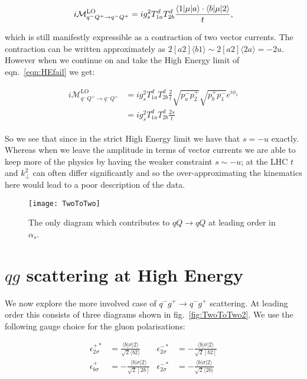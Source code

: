	\begin{equation}
		i\mathcal{M}_{q^-Q^+\rightarrow q^-Q^+}^{\text{LO}} = ig_s^2T^d_{1a}T^d_{2b}
		\frac{\langle 1 | \mu | a \rangle\cdot\langle b | \mu | 2 \rangle}{t},
		\label{eqn:HEfail}
	\end{equation}

	which is still manifestly expressible as a contraction of two vector currents.  The contraction
	can be written approximately as $2[a2]\langle b1\rangle\sim2[a2]\langle2a\rangle=-2u$.
	However when we continue on and take the High Energy limit of eqn.~\eqref{eqn:HEfail} we get:

	\begin{align}
	\begin{split}
		i\mathcal{M}_{q^-Q^+\rightarrow q^-Q^+}^{\text{LO}} &=
		ig_s^2T^d_{1a}T^d_{2b}\frac{2}{t}\sqrt{p_a^-p_2^+}\sqrt{p_b^+p_1^-}e^{i\phi_1}\\
		&=ig_s^2T^d_{1a}T^d_{2b}\frac{2s}{t}
		\label{eqn:HEfail2}
	\end{split}
	\end{align}

	So we see that since in the strict High Energy limit we have that $s=-u$
	exactly.  Whereas when we leave the amplitude in terms of vector currents we are able to keep
	more of the physics by having the weaker constraint $s\sim-u$; at the LHC $t$ and $k_\perp^2$
	can often differ significantly and so the over-approximating the kinematics here would
	lead to a poor description of the data.

	\begin{figure}
		\begin{center}
		\texttt{[image: TwoToTwo]}
		\caption{The only diagram which contributes to $qQ\rightarrow qQ$ at leading order in $\alpha_s$.}
		\label{fig:TwoToTwo}
		\end{center}
	\end{figure}

\section{$qg$ scattering at High Energy}
	\label{sec:qg}

	We now explore the more involved case of $q^-g^+\to q^-g^+$ scattering.  At leading order this
	consists of three diagrams shown in fig.~\eqref{fig:TwoToTwo2}.  We use the following gauge
	choice for the gluon polarisations:

	\begin{align}
	\epsilon^{+*}_{2\sigma}&=\frac{\langle b|\sigma|2\rangle}{\sqrt{2}\langle b2\rangle}
	& \epsilon^{-*}_{2\sigma} &= -\frac{\langle b|\sigma|2\rangle}{\sqrt{2}[b2]} \\
	\epsilon^{+}_{b\sigma}&=-\frac{\langle b|\sigma|2\rangle}{\sqrt{2}[2b]}
	& \epsilon^{-*}_{2\sigma} &= -\frac{\langle b|\sigma|2\rangle}{\sqrt{2}\langle 2b\rangle}
	\end{align}

